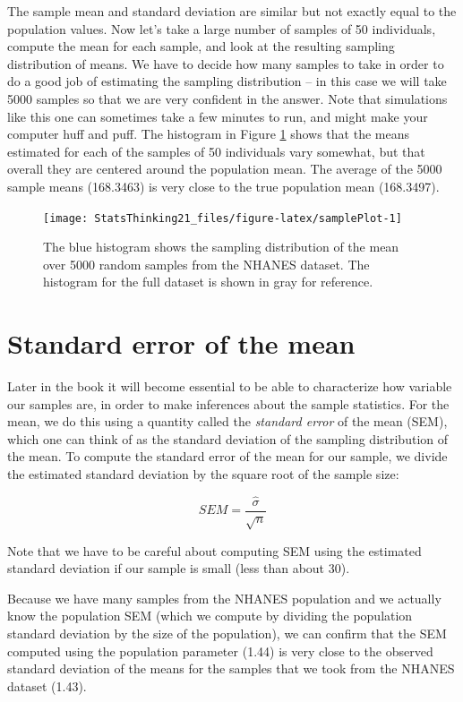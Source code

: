 \documentclass[12pt,]{book}
\theoremstyle{definition}
\theoremstyle{definition}
\theoremstyle{definition}
\theoremstyle{remark}
\begin{document}
The sample mean and standard deviation are similar but not exactly equal to the population values. Now let's take a large number of samples of 50 individuals, compute the mean for each sample, and look at the resulting sampling distribution of means. We have to decide how many samples to take in order to do a good job of estimating the sampling distribution -- in this case we will take 5000 samples so that we are very confident in the answer. Note that simulations like this one can sometimes take a few minutes to run, and might make your computer huff and puff. The histogram in Figure \ref{fig:samplePlot} shows that the means estimated for each of the samples of 50 individuals vary somewhat, but that overall they are centered around the population mean. The average of the 5000 sample means (168.3463) is very close to the true population mean (168.3497).

\begin{figure}
\texttt{[image: StatsThinking21\_files/figure-latex/samplePlot-1]} \caption{The blue histogram shows the sampling distribution of the mean over 5000 random samples from the NHANES dataset.  The histogram for the full dataset is shown in gray for reference.}\label{fig:samplePlot}
\end{figure}

\hypertarget{standard-error-of-the-mean}{%
\section{Standard error of the mean}\label{standard-error-of-the-mean}}

Later in the book it will become essential to be able to characterize how variable our samples are, in order to make inferences about the sample statistics. For the mean, we do this using a quantity called the \emph{standard error} of the mean (SEM), which one can think of as the standard deviation of the sampling distribution of the mean. To compute the standard error of the mean for our sample, we divide the estimated standard deviation by the square root of the sample size:

\[
SEM = \frac{\hat{\sigma}}{\sqrt{n}}
\]

Note that we have to be careful about computing SEM using the estimated standard deviation if our sample is small (less than about 30).

Because we have many samples from the NHANES population and we actually know the population SEM (which we compute by dividing the population standard deviation by the size of the population), we can confirm that the SEM computed using the population parameter (1.44) is very close to the observed standard deviation of the means for the samples that we took from the NHANES dataset (1.43).
\end{document}
